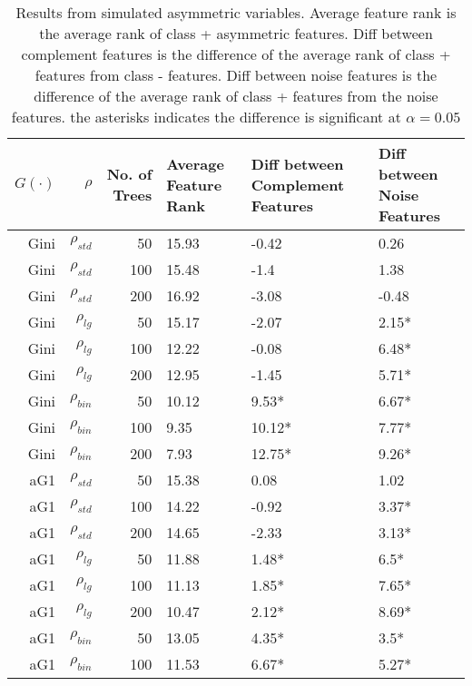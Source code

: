 \documentclass[twoside,11pt]{article}
\begin{document}
\begin{table}%
  \centering
  \caption{Results from simulated asymmetric variables. Average feature rank is the average rank of class + asymmetric features. Diff between complement features is the difference of the average rank of class + features from class - features. Diff between noise features is the difference of the average rank of class + features from the noise features. the asterisks indicates the difference is significant at $\alpha=0.05$ }
\begin{tabular}{rrrp{2.5cm}p{2.5cm}p{2.5cm}}
\hline
$G(\cdot)$ & $\rho$ & No. of Trees & Average Feature Rank & Diff between Complement Features & Diff between Noise Features \bigstrut\\
\hline
\renewcommand{\arraystretch}{.5}
Gini     & $\rho_{std}$ & 50    & 15.93 & -0.42 & 0.26 \bigstrut[t]\\
Gini     & $\rho_{std}$ & 100   & 15.48 & -1.4  & 1.38 \\
Gini     & $\rho_{std}$ & 200   & 16.92 & -3.08 & -0.48 \bigstrut[b]\\
\hline
Gini     & $\rho_{lg}$ & 50    & 15.17 & -2.07 & 2.15* \bigstrut[t]\\
Gini     & $\rho_{lg}$ & 100   & 12.22 & -0.08 & 6.48* \\
Gini     & $\rho_{lg}$ & 200   & 12.95 & -1.45 & 5.71* \bigstrut[b]\\
\hline
Gini     & $\rho_{bin}$ & 50    & 10.12 & 9.53* & 6.67* \bigstrut[t]\\
Gini     & $\rho_{bin}$ & 100   & 9.35  & 10.12* & 7.77* \\
Gini     & $\rho_{bin}$ & 200   & 7.93  & 12.75* & 9.26* \bigstrut[b]\\
\hline
aG1   & $\rho_{std}$ & 50    & 15.38 & 0.08  & 1.02 \bigstrut[t]\\
aG1   & $\rho_{std}$ & 100   & 14.22 & -0.92 & 3.37* \\
aG1   & $\rho_{std}$ & 200   & 14.65 & -2.33 & 3.13* \bigstrut[b]\\
\hline
aG1   & $\rho_{lg}$ & 50    & 11.88 & 1.48* & 6.5* \bigstrut[t]\\
aG1   & $\rho_{lg}$ & 100   & 11.13 & 1.85* & 7.65* \\
aG1   & $\rho_{lg}$ & 200   & 10.47 & 2.12* & 8.69* \bigstrut[b]\\
\hline
aG1   & $\rho_{bin}$ & 50    & 13.05 & 4.35* & 3.5* \bigstrut[t]\\
aG1   & $\rho_{bin}$ & 100   & 11.53 & 6.67* & 5.27* \\

\end{tabular}
\end{table}
\end{document}
